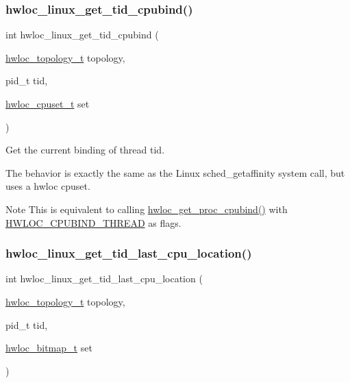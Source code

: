 \subsubsection{\texorpdfstring{hwloc\+\_\+linux\+\_\+get\+\_\+tid\+\_\+cpubind()}{hwloc\_linux\_get\_tid\_cpubind()}}
{\footnotesize\ttfamily int hwloc\+\_\+linux\+\_\+get\+\_\+tid\+\_\+cpubind (\begin{DoxyParamCaption}\item[{\hyperlink{a00186_ga9d1e76ee15a7dee158b786c30b6a6e38}{hwloc\+\_\+topology\+\_\+t}}]{topology,  }\item[{pid\+\_\+t}]{tid,  }\item[{\hyperlink{a00183_ga4bbf39b68b6f568fb92739e7c0ea7801}{hwloc\+\_\+cpuset\+\_\+t}}]{set }\end{DoxyParamCaption})}



Get the current binding of thread {\ttfamily tid}. 

The behavior is exactly the same as the Linux sched\+\_\+getaffinity system call, but uses a hwloc cpuset.

\begin{DoxyNote}{Note}
This is equivalent to calling \hyperlink{a00190_gac82de91f788fa82dacf99c6e0d4b7158}{hwloc\+\_\+get\+\_\+proc\+\_\+cpubind()} with \hyperlink{a00190_gga217dc8d373f8958cc93c154ebce1c71caf1b6bbad00d7b1017b918e3719f4d421}{H\+W\+L\+O\+C\+\_\+\+C\+P\+U\+B\+I\+N\+D\+\_\+\+T\+H\+R\+E\+AD} as flags. 
\end{DoxyNote}
\mbox{\label{a00214_gacc7945c2d06c6db1e58f8fd953009134}} 
\subsubsection{\texorpdfstring{hwloc\+\_\+linux\+\_\+get\+\_\+tid\+\_\+last\+\_\+cpu\+\_\+location()}{hwloc\_linux\_get\_tid\_last\_cpu\_location()}}
{\footnotesize\ttfamily int hwloc\+\_\+linux\+\_\+get\+\_\+tid\+\_\+last\+\_\+cpu\+\_\+location (\begin{DoxyParamCaption}\item[{\hyperlink{a00186_ga9d1e76ee15a7dee158b786c30b6a6e38}{hwloc\+\_\+topology\+\_\+t}}]{topology,  }\item[{pid\+\_\+t}]{tid,  }\item[{\hyperlink{a00205_gaa3c2bf4c776d603dcebbb61b0c923d84}{hwloc\+\_\+bitmap\+\_\+t}}]{set }\end{DoxyParamCaption})}



